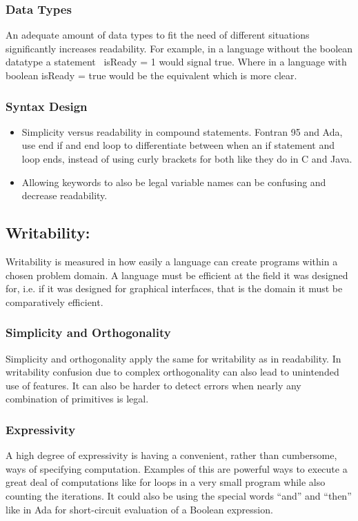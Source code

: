 \subsubsection*{Data Types}
An adequate amount of data types to fit the need of different situations significantly increases readability. For example, in a language without the boolean datatype a statement 
isReady = 1 would signal true. Where in a language with boolean isReady = true would be the equivalent which is more clear.

\subsubsection*{Syntax Design}
\begin{itemize}
 \item Simplicity versus readability in compound statements. Fontran 95 and Ada, use end if and end loop to differentiate between when an if statement and loop ends, instead of using curly brackets for both like they do in C and Java.
\item Allowing keywords to also be legal variable names can be confusing and decrease readability.
\end{itemize}

\subsection*{Writability:}
Writability is measured in how easily a language can create programs within a chosen problem domain.
A language must be efficient at the field it was designed for, i.e. if it was designed for graphical interfaces, that is the domain it must be comparatively efficient.
\subsubsection*{Simplicity and Orthogonality}
Simplicity and orthogonality apply the same for writability as in readability. In writability confusion due to complex orthogonality can also lead to unintended use of features. It can also be harder to detect errors when nearly any combination of primitives is legal.
\subsubsection*{Expressivity}
A high degree of expressivity is having a convenient, rather than cumbersome, ways of specifying computation. Examples of this are powerful ways to execute a great deal of computations like for loops in a very small program while also counting the iterations. It could also be using the special words “and” and “then” like in Ada for short-circuit evaluation of a Boolean expression.

